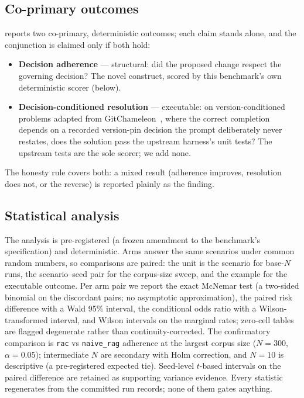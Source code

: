 \subsection{Co-primary outcomes}
\benchname{} reports two co-primary, deterministic outcomes; each claim stands
alone, and the conjunction is claimed only if both hold:
\begin{itemize}
  \item \textbf{Decision adherence} --- structural: did the proposed change
        respect the governing decision? The novel construct, scored by this
        benchmark's own deterministic scorer (below).
  \item \textbf{Decision-conditioned resolution} --- executable: on
        version-conditioned problems adapted from
        GitChameleon~\citep{gitchameleon}, where the correct completion depends
        on a recorded version-pin decision the prompt deliberately never
        restates, does the solution pass the upstream harness's unit tests?
        The upstream tests are the sole scorer; we add none.
\end{itemize}
The honesty rule covers both: a mixed result (adherence improves, resolution
does not, or the reverse) is reported plainly as the finding.

\subsection{Statistical analysis}
The analysis is pre-registered (a frozen amendment to the benchmark's
specification) and deterministic. Arms answer the same scenarios under common
random numbers, so comparisons are paired: the unit is the scenario for
base-$N$ runs, the scenario--seed pair for the corpus-size sweep, and the
example for the executable outcome. Per arm pair we report the exact McNemar
test (a two-sided binomial on the discordant pairs; no asymptotic
approximation), the paired risk difference with a Wald 95\% interval, the
conditional odds ratio with a Wilson-transformed interval, and Wilson intervals
on the marginal rates; zero-cell tables are flagged degenerate rather than
continuity-corrected. The confirmatory comparison is \texttt{rac} vs
\texttt{naive\_rag} adherence at the largest corpus size ($N{=}300$,
$\alpha{=}0.05$); intermediate $N$ are secondary with Holm correction, and
$N{=}10$ is descriptive (a pre-registered expected tie). Seed-level $t$-based
intervals on the paired difference are retained as supporting variance
evidence. Every statistic regenerates from the committed run records; none of
them gates anything.

